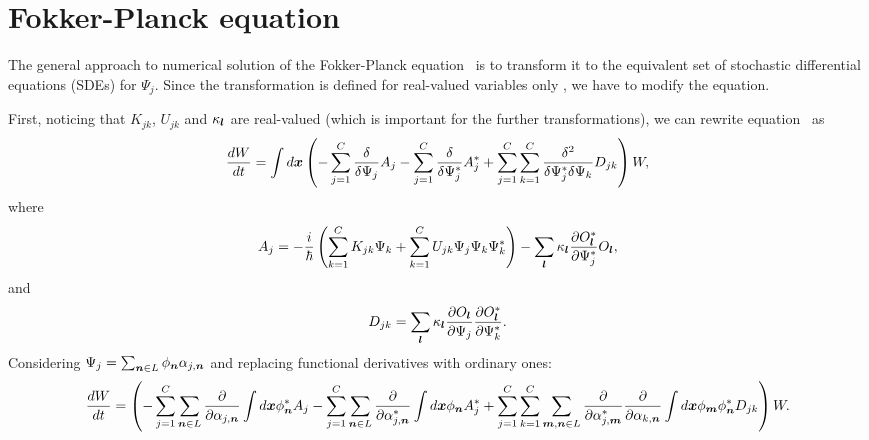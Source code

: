 \section{Fokker-Planck equation}

The general approach to numerical solution of the Fokker-Planck equation~ is to transform it to the equivalent set of stochastic differential equations (SDEs) for $\Psi_j$.
Since the transformation is defined for real-valued variables only ,
we have to modify the equation.

First, noticing that $K_{jk}$, $U_{jk}$ and $\kappa_{\boldsymbol{l}}$ are real-valued
(which is important for the further transformations),
we can rewrite equation~ as
\[
	\frac{dW}{dt}
	= \int d\boldsymbol{x} \left(
		- \sum_{j=1}^C \frac{\delta}{\delta \Psi_j} A_j
		- \sum_{j=1}^C \frac{\delta}{\delta \Psi_j^*} A_j^*
		+ \sum_{j=1}^C \sum_{k=1}^C \frac{\delta^2}{\delta \Psi_j^* \delta \Psi_k} D_{jk}
	\right) W,
\]
where
\[
	A_j = -\frac{i}{\hbar} \left(
			\sum_{k=1}^C K_{jk} \Psi_k
			+ \sum_{k=1}^C U_{jk} \Psi_j \Psi_k \Psi_k^*
		\right)
		- \sum_{\boldsymbol{l}} \kappa_{\boldsymbol{l}} \frac{\partial O_{\boldsymbol{l}}^*}{\partial \Psi_j^*} O_{\boldsymbol{l}},
\]
and
\[
	D_{jk} = \sum_{\boldsymbol{l}} \kappa_{\boldsymbol{l}}
		\frac{\partial O_{\boldsymbol{l}}}{\partial \Psi_j}
		\frac{\partial O_{\boldsymbol{l}}^*}{\partial \Psi_k^*}.
\]
Considering $\Psi_j = \sum_{\boldsymbol{n} \in L} \phi_{\boldsymbol{n}} \alpha_{j,\boldsymbol{n}}$ and replacing functional derivatives with ordinary ones:
\[
	\frac{dW}{dt}
	= \left(
		- \sum_{j=1}^C \sum_{\boldsymbol{n} \in L}
			\frac{\partial}{\partial \alpha_{j,\boldsymbol{n}}}
			\int d\boldsymbol{x} \phi_{\boldsymbol{n}}^* A_j
		- \sum_{j=1}^C \sum_{\boldsymbol{n} \in L}
			\frac{\partial}{\partial \alpha_{j,\boldsymbol{n}}^*}
			\int d\boldsymbol{x} \phi_{\boldsymbol{n}} A_j^*
		+ \sum_{j=1}^C \sum_{k=1}^C
			\sum_{\boldsymbol{m},\boldsymbol{n} \in L}
			\frac{\partial}{\partial \alpha_{j,\boldsymbol{m}}^*}
			\frac{\partial}{\partial \alpha_{k,\boldsymbol{n}}}
			\int d\boldsymbol{x}
			\phi_{\boldsymbol{m}} \phi_{\boldsymbol{n}}^* D_{jk}
	\right) W.
\]

